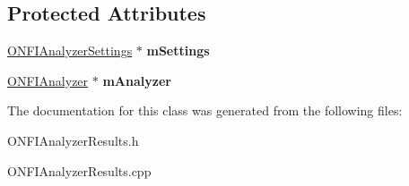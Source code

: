 \subsection*{Protected Attributes}
\begin{DoxyCompactItemize}
\item 
\mbox{\label{classONFIAnalyzerResults_aa06d97ad6905e9020761f0254efd80cd}} 
\hyperlink{classONFIAnalyzerSettings}{O\+N\+F\+I\+Analyzer\+Settings} $\ast$ {\bfseries m\+Settings}
\item 
\mbox{\label{classONFIAnalyzerResults_a520bb2c84973ec274623e4ab33b5c468}} 
\hyperlink{classONFIAnalyzer}{O\+N\+F\+I\+Analyzer} $\ast$ {\bfseries m\+Analyzer}
\end{DoxyCompactItemize}


The documentation for this class was generated from the following files\+:\begin{DoxyCompactItemize}
\item 
O\+N\+F\+I\+Analyzer\+Results.\+h\item 
O\+N\+F\+I\+Analyzer\+Results.\+cpp\end{DoxyCompactItemize}
